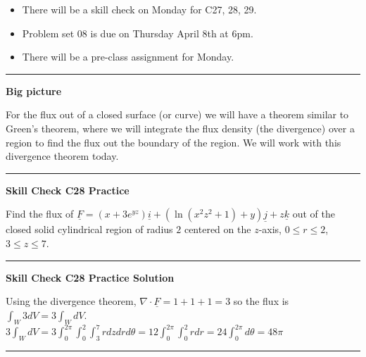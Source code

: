\documentclass[12pt,letterpaper,noanswers]{exam}
\newcommand{\mb}[1]{\underline{#1}}
\begin{document}
 \pdfpageheight 11in 
  \pdfpagewidth 8.5in





\begin{itemize}
\itemsep0em
\item There will be a skill check on Monday for C27, 28, 29.
\item Problem set 08 is due on Thursday April 8th at 6pm.
\item There will be a pre-class assignment for Monday.
\end{itemize}

\hrule
\vspace{0.2cm}


\noindent\textbf{Big picture}

For the flux out of a closed surface (or curve) we will have a theorem similar to Green's theorem, where we will integrate the flux density (the divergence) over a region to find the flux out the boundary of the region.  We will work with this divergence theorem today.

\vspace{0.2cm}
\hrule
\vspace{0.2cm}

\noindent\textbf{Skill Check C28 Practice}

 Find the flux of $\underline F = (x+3e^{yz})\mb i + (\ln(x^2z^2+1)+y)\mb j + z\mb k$ out of the closed solid cylindrical region of radius $2$ centered on the $z$-axis, $0\leq r\leq 2$, $3\leq z \leq 7$.

\vspace{0.2cm}
\hrule
\vspace{0.2cm}

\noindent\textbf{Skill Check C28 Practice Solution}

Using the divergence theorem, $\nabla\cdot \underline F = 1 + 1 + 1 = 3$ so the flux is $\int_W 3dV = 3\int_W dV$.  
$3\int_W dV = 3\int_0^{2\pi}\int_0^2\int_3^7 rdzdrd\theta = 12\int_0^{2\pi}\int_0^2 rdr = 24\int_0^{2\pi}d\theta = 48\pi$

\vspace{0.2cm}
\hrule
\vspace{0.2cm}
\end{document}
